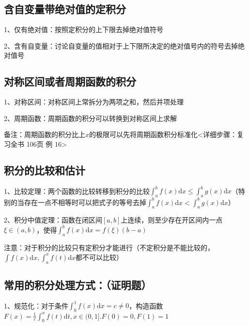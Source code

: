 \subsection{含自变量带绝对值的定积分}

1、仅有绝对值：按照定积分的上下限去掉绝对值符号

2、含有自变量：讨论自变量的值相对于上下限所决定的绝对值号内的符号去掉绝对值号



\subsection{对称区间或者周期函数的积分}

1、对称区间：对称区间上常拆分为两项之和，然后并项处理

2、周期函数：周期函数的积分可以转换到对称区间上求解

备注：周期函数的积分比上$x$的极限可以先将周期函数积分标准化<详细步骤：复习全书 106页 例 16>



\subsection{积分的比较和估计}

1、比较定理：两个函数的比较转移到积分的比较$\int_{a}^{b} f(x) \mathrm{d} x \leqslant \int_{a}^{b} g(x) \mathrm{d} x$（特别的当存在一点不相等时可以把式子的等号去掉$\int_{a}^{b} f(x) \mathrm{d} x<\int_{a}^{b} g(x) \mathrm{d} x$）

2、积分中值定理：函数在闭区间$[a,b]$上连续，则至少存在开区间内一点$\xi \in (a,b)$，使得$\int_{a}^{b} f(x) \mathrm{d} x=f(\xi)(b-a)$

注意：对于积分的比较只有定积分才能进行（不定积分是不能比较的，$\int f(x) \mathrm{d} x,\int_{a}^{x} f(t) \mathrm{d}x$都不可以比较）



\subsection{常用的积分处理方式：（证明题）}

1、规范化：对于条件$\int_{0}^{1} f(x) \mathrm{d} x=c \neq 0$，构造函数$F(x)=\frac{1}{c} \int_{0}^{x} f(t) \mathrm{d} t, x \in(0,1] . F(0)=0, F(1)=1$

